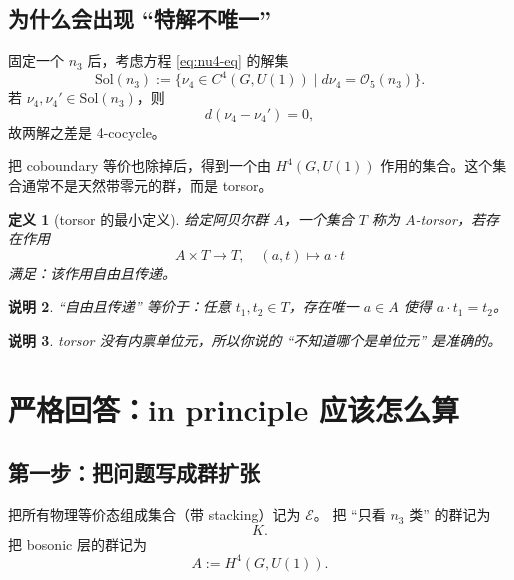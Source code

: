 \documentclass[a4paper,fontset=ubuntu,12pt]{ctexart}
\newtheorem{definition}{定义}[section]
\newtheorem{remark}[definition]{说明}
\begin{document}
\subsection{为什么会出现 ``特解不唯一''}

固定一个 $n_3$ 后，考虑方程 \eqref{eq:nu4-eq} 的解集
\begin{equation}
\mathrm{Sol}(n_3):=\{\nu_4\in C^4(G,U(1))\mid d\nu_4=\mathcal{O}_5(n_3)\}.
\label{eq:sol-set}
\end{equation}
若 $\nu_4,\nu_4'\in \mathrm{Sol}(n_3)$，则
\begin{equation}
d(\nu_4-\nu_4')=0,
\label{eq:diff-cocycle}
\end{equation}
故两解之差是 4-cocycle。

把 coboundary 等价也除掉后，得到一个由 $H^4(G,U(1))$ 作用的集合。这个集合通常不是天然带零元的群，而是 torsor。

\begin{definition}[torsor 的最小定义]
给定阿贝尔群 $A$，一个集合 $T$ 称为 $A$-torsor，若存在作用
\begin{equation}
A\times T\to T,\quad (a,t)\mapsto a\cdot t
\label{eq:torsor-action}
\end{equation}
满足：该作用自由且传递。
\end{definition}

\begin{remark}
``自由且传递'' 等价于：任意 $t_1,t_2\in T$，存在唯一 $a\in A$ 使得 $a\cdot t_1=t_2$。
\end{remark}

\begin{remark}
torsor 没有内禀单位元，所以你说的 ``不知道哪个是单位元'' 是准确的。
\end{remark}

\section{严格回答：in principle 应该怎么算}
\label{sec:in-principle}

\subsection{第一步：把问题写成群扩张}

把所有物理等价态组成集合（带 stacking）记为 $\mathcal{E}$。
把 ``只看 $n_3$ 类'' 的群记为
\begin{equation}
K.
\label{eq:k-def}
\end{equation}
把 bosonic 层的群记为
\begin{equation}
A:=H^4(G,U(1)).
\label{eq:a-def}
\end{equation}
\end{document}
